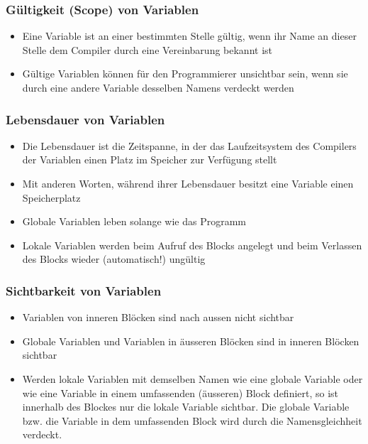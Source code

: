 \subsubsection{Gültigkeit (Scope) von Variablen\hfill}
\label{sec:Gueltigkeit (Scope) von Variablen}
\begin{itemize}
	\item Eine Variable ist an einer bestimmten Stelle gültig, wenn ihr Name an dieser Stelle dem Compiler durch eine Vereinbarung bekannt ist
	\item Gültige Variablen können für den Programmierer unsichtbar sein, wenn sie durch eine andere Variable desselben Namens verdeckt werden
\end{itemize}

\subsubsection{Lebensdauer von Variablen\hfill}
\label{sec:Lebensdauer von Variablen}
\begin{itemize}
	\item Die Lebensdauer ist die Zeitspanne, in der das Laufzeitsystem des Compilers der Variablen einen Platz im Speicher zur Verfügung stellt
	\item Mit anderen Worten, während ihrer Lebensdauer besitzt eine Variable einen Speicherplatz
	\item Globale Variablen leben solange wie das Programm
	\item Lokale Variablen werden beim Aufruf des Blocks angelegt und beim Verlassen des Blocks wieder (automatisch!) ungültig
\end{itemize}

\subsubsection{Sichtbarkeit von Variablen\hfill}
\label{sec:Sichtbarkeit von Variablen}
\begin{itemize}
	\item Variablen von inneren Blöcken sind nach aussen nicht sichtbar
	\item Globale Variablen und Variablen in äusseren Blöcken sind in inneren Blöcken sichtbar
	\item Werden lokale Variablen mit demselben Namen wie eine globale Variable oder wie eine Variable in einem umfassenden (äusseren) Block definiert, so ist innerhalb des Blockes nur die lokale Variable sichtbar. Die globale Variable bzw. die Variable in dem umfassenden Block wird durch die Namensgleichheit verdeckt.
\end{itemize}

